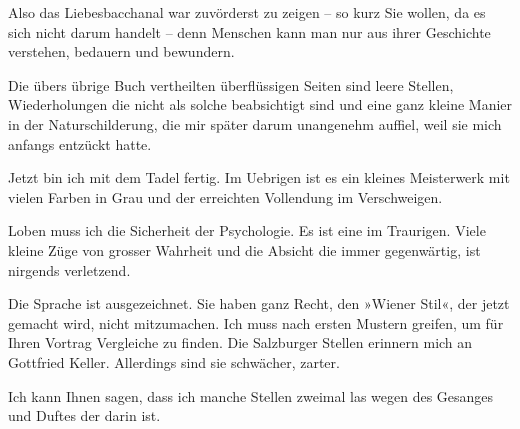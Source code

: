 \pstart
           Also das Liebesbacchanal war zuvörderst zu zeigen – so kurz Sie wollen, da es sich
               nicht darum handelt – denn Menschen kann man nur aus ihrer Geschichte verstehen,
               bedauern und bewundern.\pend
           
\pstart
           Die übers übrige Buch
               vertheilten überflüssigen Seiten sind leere Stellen, Wiederholungen die nicht als
               solche beabsichtigt sind und eine ganz kleine Manier in der {\pb}Naturschilderung, die mir später darum
               unangenehm auffiel, weil sie mich anfangs entzückt hatte.\pend
           
\pstart
           Jetzt bin ich mit dem Tadel fertig. Im Uebrigen ist es ein kleines Meisterwerk mit
               vielen Farben in Grau und der erreichten Vollendung im Verschweigen.\pend
           
\pstart
           Loben muss ich die Sicherheit der Psychologie. Es ist eine \label{K_L03837-3v}\label{K_L03837-3} im Traurigen. Viele kleine Züge von grosser
               Wahrheit und die Absicht die immer gegenwärtig, ist nirgends verletzend.\pend
           
\pstart
           Die Sprache ist ausgezeichnet. Sie haben ganz Recht, den »Wiener Stil«, der jetzt gemacht wird, nicht mitzumachen. Ich
               muss nach ersten Mustern greifen, um für Ihren Vortrag Vergleiche zu finden. Die Salzburger Stellen erinnern {\pb}mich an Gottfried Keller. Allerdings sind sie schwächer, zarter.\pend
           
\pstart
           Ich kann Ihnen sagen, dass ich manche Stellen zweimal las wegen des Gesanges und
               Duftes der darin ist.\pend
           
